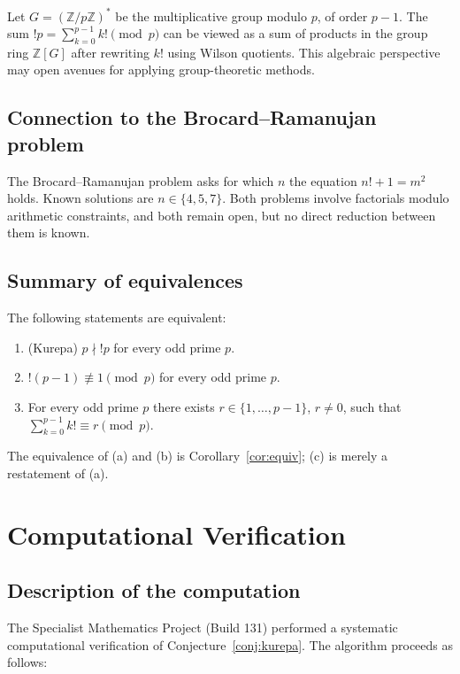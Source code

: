 \documentclass[12pt,a4paper]{amsart}
\theoremstyle{definition}
\newcommand{\Z}{\mathbb{Z}}
\begin{document}
Let $G = (\Z/p\Z)^*$ be the multiplicative group modulo $p$, of order $p-1$.
The sum $!p = \sum_{k=0}^{p-1} k! \pmod p$ can be viewed as a sum of
products in the group ring $\Z[G]$ after rewriting $k!$ using Wilson quotients.
This algebraic perspective may open avenues for applying group-theoretic
methods.

\subsection{Connection to the Brocard--Ramanujan problem}

The Brocard--Ramanujan problem asks for which $n$ the equation
$n! + 1 = m^2$ holds.
Known solutions are $n \in \{4,5,7\}$.
Both problems involve factorials modulo arithmetic constraints, and both remain
open, but no direct reduction between them is known.

\subsection{Summary of equivalences}

The following statements are equivalent:
\begin{enumerate}[label=(\alph*)]
\item (Kurepa) $p \nmid !p$ for every odd prime $p$.
\item $!(p-1) \not\equiv 1 \pmod p$ for every odd prime $p$.
\item For every odd prime $p$ there exists $r \in \{1,\ldots,p-1\}$,
      $r \neq 0$, such that $\sum_{k=0}^{p-1} k! \equiv r \pmod p$.
\end{enumerate}

The equivalence of (a) and (b) is Corollary~\ref{cor:equiv};
(c) is merely a restatement of (a).

\section{Computational Verification}
\label{sec:computation}

\subsection{Description of the computation}

The Specialist Mathematics Project (Build 131) performed a systematic
computational verification of Conjecture~\ref{conj:kurepa}.
The algorithm proceeds as follows:
\end{document}
